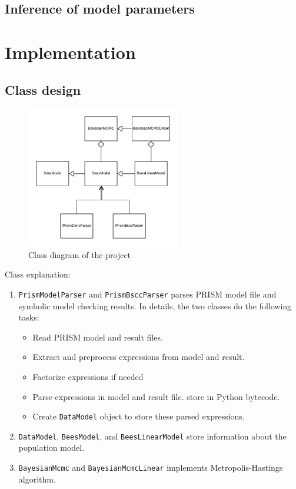 \documentclass[12pt]{article}
\theoremstyle{definition}
\begin{document}
\subsection{Inference of model parameters}



\section{Implementation}
\subsection{Class design}
\begin{figure}[H]
  \centering
  \includegraphics[width=0.6\textwidth,keepaspectratio]{figures/class_diagram.png}
  \caption{Class diagram of the project}
\end{figure}
Class explanation:
\begin{enumerate}
\item \texttt{PrismModelParser} and \texttt{PrismBsccParser} parses PRISM model
  file and symbolic model checking results. In details, the two classes do the
  following tasks:
  \begin{itemize}
  \item Read PRISM model and result files.
  \item Extract and preprocess expressions from model and result.
  \item Factorize expressions if needed
  \item Parse expressions in model and result file. store in Python bytecode.
  \item Create \texttt{DataModel} object to store these parsed expressions.
  \end{itemize}
\item \texttt{DataModel}, \texttt{BeesModel}, and \texttt{BeesLinearModel} store
  information about the population model.
\item \texttt{BayesianMcmc} and \texttt{BayesianMcmcLinear} implements
  Metropolis-Hastings algorithm.
\end{enumerate}
\end{document}
